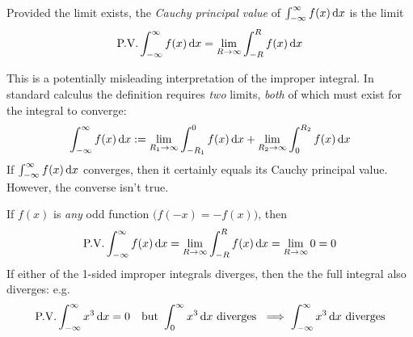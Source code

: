 \begin{defn}{}{}
Provided the limit exists, the \emph{Cauchy principal value} of $\int_{-\infty}^\infty f(x)\,{\mathrm{d} x}$ is the limit
\[\text{P.V.}\int_{-\infty}^\infty f(x)\,{\mathrm{d} x} =\lim_{R\to\infty}\int_{-R}^R f(x)\,{\mathrm{d} x}\]
\end{defn}

This is a potentially misleading interpretation of the improper integral. In standard calculus the definition requires \emph{two} limits, \emph{both} of which must exist for the integral to converge:
\[\int_{-\infty}^\infty f(x)\,{\mathrm{d} x}:=\lim_{R_1\to\infty}\int_{-R_1}^0f(x)\,{\mathrm{d} x}+\lim_{R_2\to\infty}\int_0^{R_2}f(x)\,{\mathrm{d} x}\]
If $\int_{-\infty}^\infty f(x)\,{\mathrm{d} x}$ converges, then it certainly equals its Cauchy principal value. However, the converse isn't true.

\begin{example}{}{}
If $f(x)$ is \emph{any} odd function $\bigl(f(-x)=-f(x)\bigr)$, then
\[\text{P.V.}\int_{-\infty}^\infty f(x)\,{\mathrm{d} x} =\lim_{R\to\infty}\int_{-R}^R f(x)\,{\mathrm{d} x} =\lim_{R\to \infty}0=0\]
If either of the 1-sided improper integrals diverges, then the the full integral also diverges: e.g.
\[\text{P.V.}\int_{-\infty}^\infty x^3\,{\mathrm{d} x}=0\quad \text{but}\ \int_{0}^\infty x^3\,{\mathrm{d} x}\text{ diverges }\implies \int_{-\infty}^\infty x^3\,{\mathrm{d} x}\text{ diverges}\]
\end{example}

